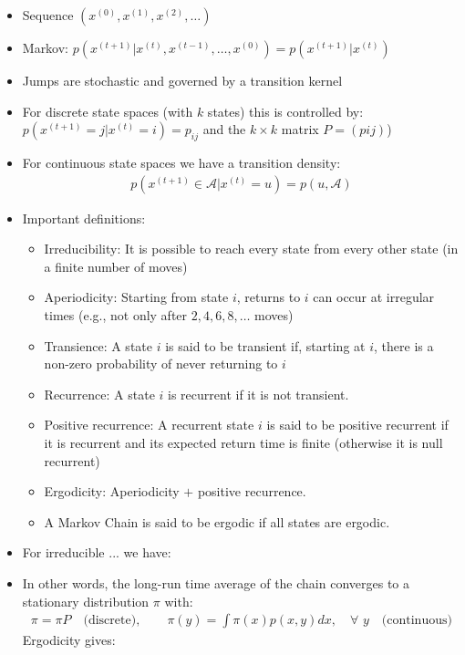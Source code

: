 \documentclass[11pt]{article}
\begin{document}
\begin{itemize}
\begin{itemize}
	\item Sequence $(x^{(0)},x^{(1)},x^{(2)},\ldots)$
	\item Markov: $p(x^{(t+1)}|x^{(t)},x^{(t-1)},\ldots,x^{(0)}) = p(x^{(t+1)}|x^{(t)})$
	\item Jumps are stochastic and governed by a transition kernel
	\item For discrete state spaces (with $k$ states) this is controlled by:
	$p(x^{(t+1)}=j|x^{(t)}=i) = p_{ij}$ and the  $k\times{}k$ matrix $P=(p{ij})$)
	\item For continuous state spaces we have a transition density:
	\begin{align*}
	  p(x^{(t+1)}\in\mathcal{A}|x^{(t)}=u) = p(u,\mathcal{A})
    \end{align*}
    \item Important definitions:
    \begin{itemize}
    \item Irreducibility: It is possible to reach every state from every other state (in a finite number of moves)
    \item Aperiodicity: Starting from state $i$, returns to $i$ can occur at irregular times (e.g., not only after $2,4,6,8,\ldots$ moves)
    \item Transience: A state $i$ is said to be transient if, starting at $i$, there is a non-zero probability of never returning to $i$
    \item Recurrence: A state $i$ is recurrent if it is not transient.
    \item Positive recurrence: A recurrent state $i$ is said to be positive recurrent if it is recurrent and its expected return time is finite (otherwise it is null recurrent)
    \item Ergodicity: Aperiodicity $+$ positive recurrence. 
    \item A Markov Chain is said to be ergodic if all states are ergodic.
    \end{itemize}
    \item For irreducible ... we have:
    \item In other words, the long-run time average of the chain converges to a stationary distribution $\pi$ with:
    \begin{align*}
     \pi = \pi P \quad \textrm{(discrete)} , \qquad \pi(y) = \int \pi(x) p(x,y) dx , \quad \forall\,\, y \quad \textrm{(continuous)}
    \end{align*}
    Ergodicity gives:
    \begin{align*}

\end{align*}
\end{itemize}
\end{itemize}
\end{document}
